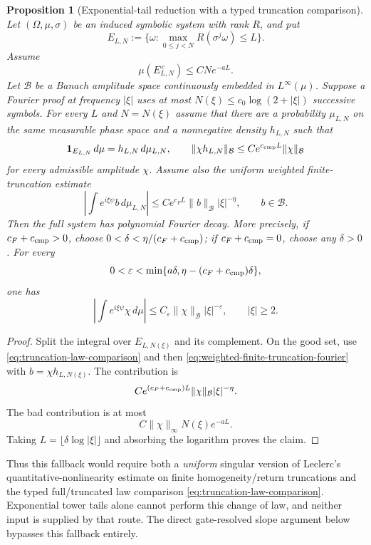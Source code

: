 \documentclass[11pt]{article}
\newtheorem{proposition}[theorem]{Proposition}
\newcommand{\one}{\mathbf 1}
\begin{document}
\begin{proposition}[Exponential-tail reduction with a typed truncation comparison]
\label{prop:countable-truncation}
Let $(\Omega,\mu,\sigma)$ be an induced symbolic system with rank $R$, and put
\[
 E_{L,N}:=\{\omega:\max_{0\le j<N}R(\sigma^j\omega)\le L\}.
\]
Assume
\[
 \mu(E_{L,N}^{\,c})\le CNe^{-aL}.
\]
Let $\mathcal B$ be a Banach amplitude space continuously embedded in
$L^\infty(\mu)$.  Suppose a Fourier proof at frequency $|\xi|$ uses at most
$N(\xi)\le c_0\log(2+|\xi|)$ successive symbols.  For every $L$ and
$N=N(\xi)$ assume that there are a probability $\mu_{L,N}$ on the same
measurable phase space and a nonnegative density $h_{L,N}$ such that
\begin{equation}
\label{eq:truncation-law-comparison}
 \one_{E_{L,N}}\,d\mu=h_{L,N}\,d\mu_{L,N},
 \qquad
 \|\chi h_{L,N}\|_{\mathcal B}
 \le Ce^{c_{\rm cmp}L}\|\chi\|_{\mathcal B}
\end{equation}
for every admissible amplitude $\chi$.  Assume also the uniform weighted
finite-truncation estimate
\begin{equation}
\label{eq:weighted-finite-truncation-fourier}
 \left|\int e^{i\xi\psi}b\,d\mu_{L,N}\right|
 \le Ce^{c_FL}\|b\|_{\mathcal B}|\xi|^{-\eta},
 \qquad b\in\mathcal B .
\end{equation}
Then the full system has polynomial Fourier decay.  More precisely, if
$c_F+c_{\rm cmp}>0$, choose
$0<\delta<\eta/(c_F+c_{\rm cmp})$; if
$c_F+c_{\rm cmp}=0$, choose any $\delta>0$.  For every
\[
 0<\varepsilon<
 \min\{a\delta,\eta-(c_F+c_{\rm cmp})\delta\},
\]
one has
\[
 \left|\int e^{i\xi\psi}\chi\,d\mu\right|
 \le C_\varepsilon\|\chi\|_{\mathcal B}|\xi|^{-\varepsilon},
 \qquad |\xi|\ge2.
\]
\end{proposition}

\begin{proof}
Split the integral over $E_{L,N(\xi)}$ and its complement.  On the good set,
use \eqref{eq:truncation-law-comparison} and then
\eqref{eq:weighted-finite-truncation-fourier} with
$b=\chi h_{L,N(\xi)}$.  The contribution is
\[
 C e^{(c_F+c_{\rm cmp})L}\|\chi\|_{\mathcal B}|\xi|^{-\eta}.
\]
The bad contribution is at most
\[
 C\|\chi\|_\infty N(\xi)e^{-aL}.
\]
Taking $L=\lfloor\delta\log|\xi|\rfloor$ and absorbing the logarithm proves
the claim.
\end{proof}

Thus this fallback would require both a \emph{uniform} singular version of
Leclerc's quantitative-nonlinearity estimate on finite homogeneity/return
truncations and the typed full/truncated law comparison
\eqref{eq:truncation-law-comparison}.  Exponential tower tails alone cannot
perform this change of law, and neither input is supplied by that route.  The
direct gate-resolved slope argument below bypasses this fallback entirely.
\end{document}
